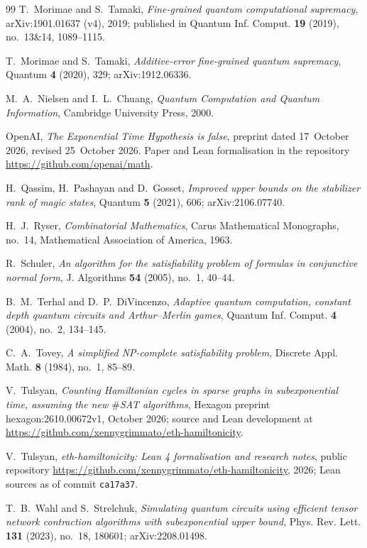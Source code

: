 \documentclass[10pt]{amsart}
\theoremstyle{plain}
\theoremstyle{definition}
\theoremstyle{remark}
\numberwithin{equation}{section}
\begin{document}
\begin{thebibliography}{99}
T.~Morimae and S.~Tamaki, \emph{Fine-grained quantum computational supremacy}, arXiv:1901.01637
(v4), 2019; published in Quantum Inf. Comput. \textbf{19} (2019), no.~13\&14, 1089--1115.

T.~Morimae and S.~Tamaki, \emph{Additive-error fine-grained quantum supremacy}, Quantum \textbf{4}
(2020), 329; arXiv:1912.06336.

M.~A.~Nielsen and I.~L.~Chuang, \emph{Quantum Computation and Quantum Information}, Cambridge
University Press, 2000.

OpenAI, \emph{The {E}xponential {T}ime {H}ypothesis is false}, preprint dated 17~October 2026, revised
25~October 2026. Paper and Lean formalisation in the repository \url{https://github.com/openai/math}.

H.~Qassim, H.~Pashayan and D.~Gosset, \emph{Improved upper bounds on the stabilizer rank of magic
states}, Quantum \textbf{5} (2021), 606; arXiv:2106.07740.

H.~J.~Ryser, \emph{Combinatorial Mathematics}, Carus Mathematical Monographs, no.~14, Mathematical
Association of America, 1963.

R.~Schuler, \emph{An algorithm for the satisfiability problem of formulas in conjunctive normal
form}, J. Algorithms \textbf{54} (2005), no.~1, 40--44.

B.~M.~Terhal and D.~P.~DiVincenzo, \emph{Adaptive quantum computation, constant depth quantum
circuits and {A}rthur--{M}erlin games}, Quantum Inf. Comput. \textbf{4} (2004), no.~2, 134--145.

C.~A.~Tovey, \emph{A simplified {NP}-complete satisfiability problem}, Discrete Appl. Math.
\textbf{8} (1984), no.~1, 85--89.

V.~Tulsyan, \emph{Counting {H}amiltonian cycles in sparse graphs in subexponential time, assuming the
new $\#${SAT} algorithms}, Hexagon preprint hexagon:2610.00672v1, October 2026; source and Lean
development at \url{https://github.com/xennygrimmato/eth-hamiltonicity}.

V.~Tulsyan, \emph{eth-hamiltonicity: {L}ean 4 formalisation and research notes}, public repository
\url{https://github.com/xennygrimmato/eth-hamiltonicity}, 2026; Lean sources as of commit
\texttt{ca17a37}.

T.~B.~Wahl and S.~Strelchuk, \emph{Simulating quantum circuits using efficient tensor network
contraction algorithms with subexponential upper bound}, Phys. Rev. Lett. \textbf{131} (2023),
no.~18, 180601; arXiv:2208.01498.

\end{thebibliography}
\end{document}
